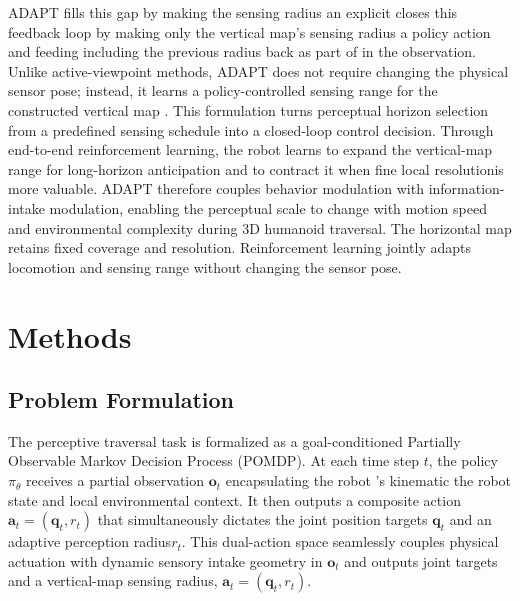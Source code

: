 \documentclass[letterpaper, 10 pt, conference]{ieeeconf/ieeeconf}
\providecommand{\DIFadd}[1]{{\protect\color{blue} \sf #1}} %
\providecommand{\DIFdel}[1]{{\protect\color{red} \scriptsize #1}} %
\providecommand{\DIFaddbegin}{} %
\providecommand{\DIFaddend}{} %
\providecommand{\DIFdelbegin}{} %
\providecommand{\DIFdelend}{} %
\begin{document}
ADAPT \DIFdelbegin \DIFdel{fills this gap by making the sensing radius an explicit }\DIFdelend \DIFaddbegin \DIFadd{closes this feedback loop by making only the vertical map's sensing radius a }\DIFaddend policy action and \DIFdelbegin \DIFdel{feeding }\DIFdelend \DIFaddbegin \DIFadd{including }\DIFaddend the previous radius \DIFdelbegin \DIFdel{back as part of }\DIFdelend \DIFaddbegin \DIFadd{in }\DIFaddend the observation. \DIFdelbegin \DIFdel{Unlike active-viewpoint methods, ADAPT does not require changing the physical sensor pose; instead, it learns a policy-controlled sensing range for the constructed vertical map . This formulation turns perceptual horizon selection from a predefined sensing schedule into a closed-loop control decision. Through end-to-end reinforcement learning, the robot learns to expand the vertical-map range for long-horizon anticipation and to contract it when fine local resolutionis more valuable. ADAPT therefore couples behavior modulation with information-intake modulation, enabling the perceptual scale to change with motion speed and environmental complexity during 3D humanoid traversal.
}\DIFdelend \DIFaddbegin \DIFadd{The horizontal map retains fixed coverage and resolution. Reinforcement learning jointly adapts locomotion and sensing range without changing the sensor pose.
}

\DIFaddend %

\section{Methods}
\subsection{Problem Formulation}
The perceptive traversal task is formalized as a goal-conditioned Partially Observable Markov Decision Process (POMDP). At \DIFdelbegin \DIFdel{each time }\DIFdelend step $t$, \DIFdelbegin \DIFdel{the }\DIFdelend policy $\pi_\theta$ receives \DIFdelbegin \DIFdel{a partial observation $\mathbf{o}_t$ encapsulating the robot 's kinematic }\DIFdelend \DIFaddbegin \DIFadd{the robot }\DIFaddend state and local \DIFdelbegin \DIFdel{environmental context. It then outputs a composite action $\mathbf{a}_t = (\mathbf{q}_t, r_t)$ that simultaneously dictates the joint position targets $\mathbf{q}_t$ and an adaptive perception radius$r_t$. This dual-action space seamlessly couples physical actuation with dynamic sensory intake}\DIFdelend \DIFaddbegin \DIFadd{geometry in $\mathbf{o}_t$ and outputs joint targets and a vertical-map sensing radius, $\mathbf{a}_t=(\mathbf{q}_t,r_t)$}\DIFaddend .
\end{document}
